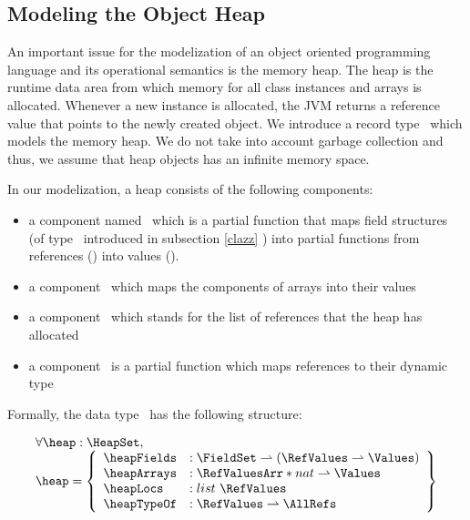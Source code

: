 

 \subsection{Modeling the Object Heap} \label{heap}
 An important issue for the modelization of an object oriented programming language and its operational semantics
 is the memory heap. The heap is the
 runtime data area from which memory  for all class instances and arrays is allocated. Whenever a new instance
 is allocated, the JVM returns a reference value that points to the newly created object. 
 We introduce a record type \HeapSet \ which models the memory heap. We do not take into account 
 garbage collection and thus, we assume that heap objects has an infinite memory space. 
 
 In our modelization, a heap consists of the following components:
 \begin{itemize}
       \item a component  named \heapFields \ which is a partial function that maps field
             structures (of type \FieldSet \ introduced in subsection \ref{clazz} ) into partial functions from references (\AllRefs)
	     into values (\Values).  
 

       \item  a component \heapArrays \ which maps the components of arrays  into their values

       \item  a component  \heapLocs  \ which stands for the  list of references that the heap has allocated  
              
       \item  a component \heapTypeOf   \ is a partial function  which maps references to their dynamic type 
 \end{itemize}


 Formally, the data type \HeapSet \ has the following structure:



  $$ \begin{array}{l}
         \forall  \heap : \HeapSet , \\
         \heap = \left\{\begin{array}{ll}  \heapFields  &  : \FieldSet \rightharpoonup (  \RefValues \rightharpoonup \Values) \\
                                           \heapArrays  &  : \RefValuesArr * nat \rightharpoonup \Values \\
					   \heapLocs    &  : list \ \RefValues \\
					   \heapTypeOf  &  : \RefValues \rightharpoonup \AllRefs
                    \end{array} \right\}
   \end{array} $$


